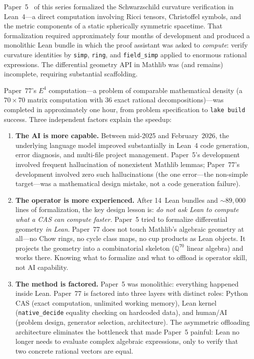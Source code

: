 \documentclass[11pt]{article}
\theoremstyle{plain}
\theoremstyle{definition}
\theoremstyle{remark}
\newcommand{\Q}{\mathbb{Q}}
\begin{document}
Paper~5~\cite{Paper5} of this series formalized the Schwarzschild
curvature verification in Lean~4---a direct computation involving
Ricci tensors, Christoffel symbols, and the metric components of
a static spherically symmetric spacetime.  That formalization
required approximately four months of development and produced a
monolithic Lean bundle in which the proof assistant was asked to
\emph{compute}: verify curvature identities by \texttt{simp},
\texttt{ring}, and \texttt{field\_simp} applied to enormous
rational expressions.  The differential geometry API in Mathlib
was (and remains) incomplete, requiring substantial scaffolding.

Paper~77's $E^4$ computation---a problem of comparable mathematical
density (a $70 \times 70$ matrix computation with 36 exact rational
decompositions)---was completed in approximately one hour, from
problem specification to \texttt{lake build} success.  Three
independent factors explain the speedup:

\begin{enumerate}[nosep]
\item \textbf{The AI is more capable.}  Between mid-2025 and
  February~2026, the underlying language model improved
  substantially in Lean~4 code generation, error diagnosis, and
  multi-file project management.  Paper~5's development involved
  frequent hallucination of nonexistent Mathlib lemmas; Paper~77's
  development involved zero such hallucinations (the one error---the
  non-simple target---was a mathematical design mistake, not a code
  generation failure).
\item \textbf{The operator is more experienced.}  After 14~Lean
  bundles and ${\sim}89{,}000$ lines of formalization, the key
  design lesson is: \emph{do not ask Lean to compute what a CAS
  can compute faster.}  Paper~5 tried to formalize differential
  geometry \emph{in Lean}.  Paper~77 does not touch Mathlib's
  algebraic geometry at all---no Chow rings, no cycle class maps,
  no cup products as Lean objects.  It projects the geometry into
  a combinatorial skeleton ($\Q^{70}$ linear algebra) and works
  there.  Knowing what to formalize and what to offload is
  operator skill, not AI capability.
\item \textbf{The method is factored.}  Paper~5 was monolithic:
  everything happened inside Lean.  Paper~77 is factored into
  three layers with distinct roles: Python CAS (exact computation,
  unlimited working memory), Lean kernel (\texttt{native\_decide}
  equality checking on hardcoded data), and human/AI (problem
  design, generator selection, architecture).  The asymmetric
  offloading architecture eliminates the bottleneck that made
  Paper~5 painful: Lean no longer needs to evaluate complex
  algebraic expressions, only to verify that two concrete rational
  vectors are equal.
\end{enumerate}
\end{document}
